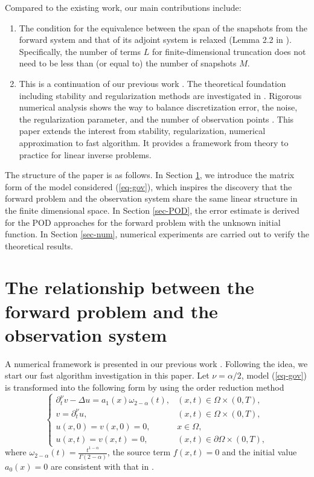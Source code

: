\documentclass[11pt]{article}
\numberwithin{equation}{section}
\begin{document}
Compared to the existing work, our main contributions include:
\begin{enumerate}
    \item The condition for the equivalence between the span of the snapshots from the forward system and that of its adjoint system is relaxed (Lemma 2.2 in \cite{ZhangZhang2024pod}). Specifically, the number of terms $L$ for finite-dimensional truncation does not need to be less than (or equal to) the number of snapshots $M$.
    \item This is a continuation of our previous work \cite{LiZhang2025,LiZhang2024}. The theoretical foundation including stability and regularization methods are investigated in \cite{LiZhang2024}. Rigorous numerical analysis shows the way to balance discretization error, the noise, the regularization parameter, and the number of observation points \cite{LiZhang2025}. This paper extends the interest from stability, regularization, numerical approximation to fast algorithm. It provides a framework from theory to practice for linear inverse problems.
    
\end{enumerate} 
 The structure of the paper is as follows. In Section \ref{frame-forward}, we introduce the matrix form of the  model considered (\ref{eq-gov}), which inspires the discovery that the forward problem and the observation system share the same linear structure in the finite dimensional space. In Section \ref{sec-POD}, the error estimate is derived for the POD approaches for the forward problem with the unknown initial function. In Section \ref{sec-num}, numerical experiments are carried out to verify the theoretical results.


\section{The relationship between the forward problem and the observation system}\label{frame-forward}
A numerical framework is presented in our previous work \cite{LiZhang2025}. Following the idea, we start our fast algorithm investigation in this paper. Let $\nu=\alpha/2$, model (\ref{eq-gov}) is transformed into the following form by using the order reduction method \cite{LiZhang2025}  
\begin{equation}\label{eq-gov-trans}
\begin{cases}
  \partial_t^\nu v - \Delta u = a_1(x)\omega_{2-\alpha}(t), & (x,t) \in \Omega \times (0,T), \\
  v  = \partial_t^\nu u, & (x,t) \in \Omega \times (0,T), \\
  u(x,0) = v(x,0)=0, & x \in \Omega, \\
  u(x,t) = v(x,t)=0, & (x,t) \in \partial \Omega \times (0,T),
\end{cases}
\end{equation}
where $\omega_{2-\alpha}(t)=\frac{t^{1-\alpha}}{\Gamma{(2-\alpha)}}$, the source term $f(x,t)=0$ and the initial value $a_0(x)=0$ are consistent with that in \cite{LiZhang2025,LiZhang2024}.
\end{document}
